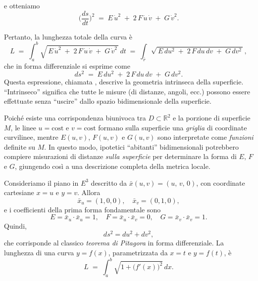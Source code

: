 e otteniamo
\vspace{0.4em}
$$
\biggl(\frac{ds}{dt}\biggr)^2
\;=\;
E\,\dot{u}^2
\;+\;
2\,F\,\dot{u}\,\dot{v}
\;+\;
G\,\dot{v}^2.
$$

Pertanto, la lunghezza totale della curva è
\vspace{0.4em}
$$
L
\;=\;
\int_a^b
\sqrt{\,E\,\dot{u}^2 
\;+\;
2\,F\,\dot{u}\,\dot{v}
\;+\;
G\,\dot{v}^2\,}\,dt
\;=\;
\int_{\bar{r}}
\sqrt{\,E\,du^2 \;+\; 2\,F\,du\,dv \;+\; G\,dv^2\,},
$$
che in forma differenziale si esprime come
\vspace{0.5em}
$$
\boxed{
ds^2
\;=\;
E\,du^2
\;+\;
2\,F\,du\,dv
\;+\;
G\,dv^2.
}
$$
Questa espressione, chiamata , descrive la geometria intrinseca della superficie. “Intrinseco” significa che tutte le misure (di distanze, angoli, ecc.) possono essere effettuate senza “uscire” dallo spazio bidimensionale della superficie.

Poiché esiste una corrispondenza biunivoca tra $D\subset \mathbb{R}^2$ e la porzione di superficie $M$, le linee $u=\text{cost}$ e $v=\text{cost}$ formano sulla superficie una \emph{griglia} di coordinate curvilinee, mentre $E(u,v)$, $F(u,v)$ e $G(u,v)$ sono interpretate come \emph{funzioni} definite su $M$. In questo modo, ipotetici “abitanti” bidimensionali potrebbero compiere misurazioni di distanze \emph{sulla superficie} per determinare la forma di $E$, $F$ e $G$, giungendo così a una descrizione completa della metrica locale.

\begin{exampleblock}[Il piano]
Consideriamo il piano in $E^3$ descritto da $\bar{x}(u,v)=(u,\,v,\,0)$, con coordinate cartesiane $x=u$ e $y=v$. Allora
$$
\bar{x}_u=(1,0,0), 
\quad
\bar{x}_v=(0,1,0),
$$
e i coefficienti della prima forma fondamentale sono
$$
E=\bar{x}_u\cdot\bar{x}_u=1,\quad
F=\bar{x}_u\cdot\bar{x}_v=0,\quad
G=\bar{x}_v\cdot\bar{x}_v=1.
$$
Quindi,
$$
ds^2=du^2+dv^2,
$$
che corrisponde al classico \emph{teorema di Pitagora} in forma differenziale. La lunghezza di una curva $y=f(x)$, parametrizzata da $x=t$ e $y=f(t)$, è
$$
L
\;=\;
\int_a^b \sqrt{1 + \bigl(f'(x)\bigr)^2}\,dx.
$$
\end{exampleblock}

